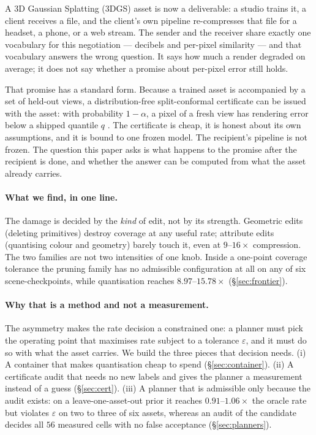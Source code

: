 \documentclass[preprint,number,3p]{elsarticle}
\begin{document}
A 3D Gaussian Splatting (3DGS) asset is now a deliverable: a studio trains it, a client receives a file, and the
client's own pipeline re-compresses that file for a headset, a phone, or a web stream. The sender and the receiver
share exactly one vocabulary for this negotiation --- decibels and per-pixel similarity --- and that vocabulary
answers the wrong question. It says how much a render degraded on average; it does not say whether a promise about
per-pixel error still holds.

That promise has a standard form. Because a trained asset is accompanied by a set of held-out views, a
distribution-free split-conformal certificate can be issued with the asset: with probability $1-\alpha$, a pixel of a
fresh view has rendering error below a shipped quantile $q$ \cite{quantilegs,vscp,aura}. The certificate is cheap, it
is honest about its own assumptions, and it is bound to one frozen model. The recipient's pipeline is not frozen. The
question this paper asks is what happens to the promise after the recipient is done, and whether the answer can be
computed from what the asset already carries.

\paragraph{What we find, in one line.} The damage is decided by the \emph{kind} of edit, not by its strength. Geometric
edits (deleting primitives) destroy coverage at any useful rate; attribute edits (quantising colour and geometry)
barely touch it, even at $9$--$16\times$ compression. The two families are not two intensities of one knob. Inside a
one-point coverage tolerance the pruning family has no admissible configuration at all on any of six
scene-checkpoints, while quantisation reaches $8.97$--$15.78\times$ (\S\ref{sec:frontier}).

\paragraph{Why that is a method and not a measurement.} The asymmetry makes the rate decision a constrained one: a
planner must pick the operating point that maximises rate subject to a tolerance $\varepsilon$, and it must do so with
what the asset carries. We build the three pieces that decision needs. (i) A container that makes quantisation cheap
to spend (\S\ref{sec:container}). (ii) A certificate audit that needs no new labels and gives the planner a
measurement instead of a guess (\S\ref{sec:cert}). (iii) A planner that is admissible only because the audit exists:
on a leave-one-asset-out prior it reaches $0.91$--$1.06\times$ the oracle rate but violates $\varepsilon$ on two to
three of six assets, whereas an audit of the candidate decides all $56$ measured cells with no false acceptance
(\S\ref{sec:planners}).
\end{document}
